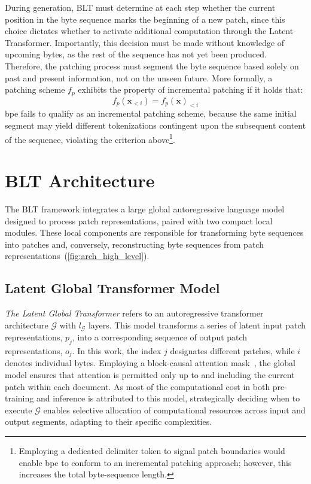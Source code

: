 During generation, {\textsc BLT} must determine at each step whether the current position in the byte sequence marks the beginning of a new patch, since this choice dictates whether to activate additional computation through the Latent Transformer. Importantly, this decision must be made without knowledge of upcoming bytes, as the rest of the sequence has not yet been produced. Therefore, the patching process must segment the byte sequence based solely on past and present information, not on the unseen future. More formally, a patching scheme $f_p$ exhibits the property of incremental patching if it holds that:
$$f_p(\pmb{x}_{<i}) = f_p(\pmb{x})_{<i}$$
bpe fails to qualify as an incremental patching scheme, because the same initial segment may yield different tokenizations contingent upon the subsequent content of the sequence, violating the criterion above\footnote{Employing a dedicated delimiter token to signal patch boundaries would enable bpe to conform to an incremental patching approach; however, this increases the total byte-sequence length.}.

\section{{\textsc BLT} Architecture}
\label{section:architecture}
The {\textsc BLT} framework integrates a large global autoregressive language model designed to process patch representations, paired with two compact local modules. These local components are responsible for transforming byte sequences into patches and, conversely, reconstructing byte sequences from patch representations~(\autoref{fig:arch_high_level}).

\subsection{Latent Global Transformer Model}

\textit{The Latent Global Transformer} refers to an autoregressive transformer architecture $\mathcal{G}$ with $l_{\mathcal{G}}$ layers. This model transforms a series of latent input patch representations, $p_j$, into a corresponding sequence of output patch representations, $o_j$. In this work, the index $j$ designates different patches, while $i$ denotes individual bytes. Employing a block-causal attention mask~\citep{dubey2024llama}, the global model ensures that attention is permitted only up to and including the current patch within each document. As most of the computational cost in both pre-training and inference is attributed to this model, strategically deciding when to execute $\mathcal{G}$ enables selective allocation of computational resources across input and output segments, adapting to their specific complexities.

